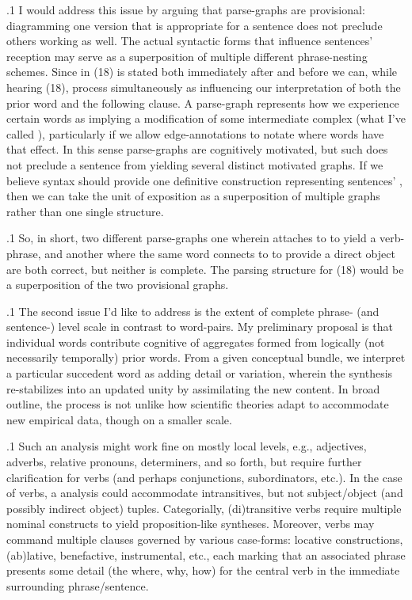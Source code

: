 \documentclass[11pt, twocolumn]{article}
\begin{document}
\p.1{%
\:\+I would address this issue by arguing that parse-graphs are provisional:
diagramming one version that is appropriate for a sentence does not
preclude others working as well. \>  The actual syntactic forms that
influence sentences' reception may serve as a superposition
of multiple different phrase-nesting schemes. \>  Since 
in \exsRef(18) is stated both immediately after  and before
 we can, while hearing \exsRef(18), process 
simultaneously as influencing our interpretation of both the
prior word and the following clause. \>  A parse-graph represents
how we experience certain words as implying a modification of
some intermediate complex (what I've called ),
particularly if we allow edge-annotations to notate where
words have that  effect. \> 
In this sense parse-graphs are cognitively motivated,
but such does not preclude a sentence from yielding several
distinct motivated graphs. \>  If we believe syntax should
provide one definitive construction representing sentences'
, then we can take the unit of exposition
as a superposition of multiple graphs rather
than one single structure.\<\;
}%

\p.1{%
\:\+So, in short, two different parse-graphs \mdash{} one wherein  attaches
to  to yield a verb-phrase, and another where the same word
connects to  to provide a direct object \mdash{} are both
correct, but neither is complete. \>  The  parsing
structure for \exsRef(18) would be a superposition of the two provisional graphs.\<\;
}%

\p.1{%
\:\+The second issue I'd like to address is the extent of complete phrase-
(and sentence-) level scale in contrast to word-pairs. \> 
My preliminary proposal is that individual words contribute
cognitive of aggregates formed from logically
(not necessarily temporally) prior words. \>  From a
given conceptual bundle, we
interpret a particular succedent word as adding detail or
variation, wherein the synthesis re-stabilizes into
an updated unity by assimilating the new content. \> 
In broad outline, the process is not unlike
how scientific theories adapt to accommodate new
empirical data, though on a smaller scale.\<\;
}%

\p.1{%
\:\+Such an analysis might work fine on mostly
local levels, e.g., adjectives, adverbs, relative
pronouns, determiners, and so forth, but require
further clarification for verbs (and perhaps conjunctions,
subordinators, etc.). \>  In the case of verbs, a
 analysis could accommodate intransitives,
but not subject/object (and possibly indirect object)
tuples. \>  Categorially, (di)transitive verbs
require multiple nominal constructs to
yield proposition-like syntheses. \>  Moreover,
verbs may command multiple clauses governed
by various case-forms: locative constructions,
(ab)lative, benefactive, instrumental, etc., each marking
that an associated phrase presents some detail
(the where, why, how) for the central verb
in the immediate surrounding phrase/sentence.\<\;
}%
\end{document}
